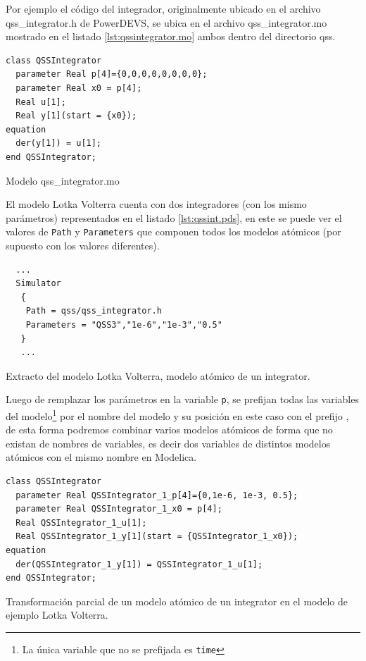 	Por ejemplo el código del integrador, originalmente ubicado en el archivo qss\_integrator.h de PowerDEVS, se ubica en el archivo qss\_integrator.mo mostrado en el listado 
	\ref{lst:qssintegrator.mo} ambos dentro del directorio qss.

\begin{listing}[H]
\begin{verbatim}
class QSSIntegrator
  parameter Real p[4]={0,0,0,0,0,0,0,0};
  parameter Real x0 = p[4];
  Real u[1];
  Real y[1](start = {x0});
equation
  der(y[1]) = u[1];
end QSSIntegrator;
\end{verbatim}
\caption{Modelo qss\_integrator.mo}
\label{lst:qssintegrator.mo}
\end{listing}

	El modelo Lotka Volterra cuenta con dos integradores (con los mismo parámetros) representados en el listado \ref{lst:qssint.pds}, en este se puede ver 
	el valores de \texttt{Path} y \texttt{Parameters} que componen todos los modelos atómicos (por supuesto con los valores diferentes).

\begin{listing}[H]
\begin{verbatim}
  ...
  Simulator
   {
    Path = qss/qss_integrator.h
    Parameters = "QSS3","1e-6","1e-3","0.5"
   }
   ...
\end{verbatim}
\label{lst:qssint.pds}
\caption{Extracto del modelo Lotka Volterra, modelo atómico de un integrator.}
\end{listing}

	Luego de remplazar los parámetros en la variable \texttt{p}, se prefijan todas las variables del modelo\footnote{La única variable que no se prefijada 
	es \texttt{time}} por el nombre del modelo y su posición en este caso con el prefijo 
	, de esta forma podremos combinar varios modelos atómicos de forma que no existan  de nombres de variables,
	es decir dos variables de distintos modelos atómicos con el mismo nombre en Modelica. 

\begin{listing}[H]
\begin{verbatim}
class QSSIntegrator
  parameter Real QSSIntegrator_1_p[4]={0,1e-6, 1e-3, 0.5};
  parameter Real QSSIntegrator_1_x0 = p[4];
  Real QSSIntegrator_1_u[1];
  Real QSSIntegrator_1_y[1](start = {QSSIntegrator_1_x0});
equation
  der(QSSIntegrator_1_y[1]) = QSSIntegrator_1_u[1];
end QSSIntegrator;
\end{verbatim}
\caption{Transformación parcial de un modelo atómico de un integrator en el modelo de ejemplo Lotka Volterra.}
\end{listing}

